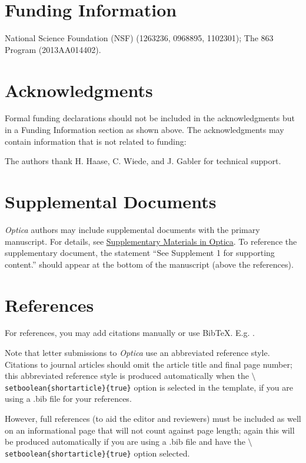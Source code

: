 \documentclass[9pt,twocolumn,twoside]{idsi}
\begin{document}
\section*{Funding Information}
National Science Foundation (NSF) (1263236, 0968895, 1102301); The 863 Program (2013AA014402).

\section*{Acknowledgments}

Formal funding declarations should not be included in the acknowledgments but in a Funding Information section as shown above. The acknowledgments may contain information that is not related to funding:

The authors thank H. Haase, C. Wiede, and J. Gabler for technical support.

\section*{Supplemental Documents}
\emph{Optica} authors may include supplemental documents with the primary manuscript. For details, see \href{http://www.opticsinfobase.org/submit/style/supplementary-materials-optica.cfm}{Supplementary Materials in Optica}. To reference the supplementary document, the statement ``See Supplement 1 for supporting content.'' should appear at the bottom of the manuscript (above the references).

\section*{References}

For references, you may add citations manually or use BibTeX. E.g. \cite{Zhang:14}.

Note that letter submissions to \emph{Optica} use an abbreviated reference style. Citations to journal articles should omit the article title and final page number; this abbreviated reference style is produced automatically when the \texttt{$\setminus$setboolean\{shortarticle\}\{true\}} option is selected in the template, if you are using a .bib file for your references. 

However, full references (to aid the editor and reviewers) must be included as well on an informational page that will not count against page length; again this will be produced automatically if you are using a .bib file and have the \texttt{$\setminus$setboolean\{shortarticle\}\{true\}} option selected.
\end{document}
